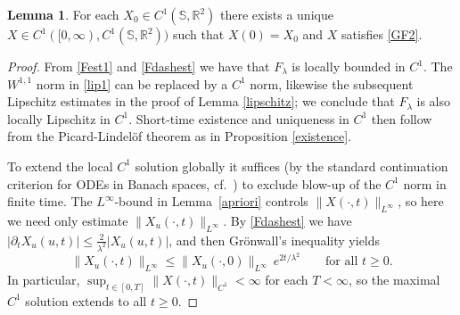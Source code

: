 \documentclass[a4paper,11pt]{amsart}
\theoremstyle{definition}\newtheorem*{definition}{Definition}
\theoremstyle{definition} \newtheorem{proposition}[theorem]{Proposition}
\theoremstyle{definition}\newtheorem{lemma}[theorem]{Lemma}
\theoremstyle{definition}\newtheorem{corollary}[theorem]{Corollary}
\theoremstyle{definition}\newtheorem{example}{Example}
\theoremstyle{remark}\newtheorem*{remark}{Remark}
\def\R{\mathbb{R}}
\def\S{\mathbb{S}}
\def\length{\mathcal L}
\begin{document}
\begin{lemma}\label{C1Lipschitz}
For each $X_0\in C^{1}(\S,\R^2)$ there exists a unique $X\in C^1([0,\infty),C^{1}(\S,\R^2))$ such that $X(0)=X_0$ and $X$ satisfies \eqref{GF2}. 
\end{lemma}
\begin{proof}
From \eqref{Fest1} and \eqref{Fdashest} we have that $F_\lambda$ is locally bounded in $C^1$. The $W^{1,1}$ norm in \eqref{lip1} can be replaced by a $C^1$ norm, likewise the subsequent Lipschitz estimates in the proof of Lemma \ref{lipschitz}; we conclude that $F_\lambda$ is also locally Lipschitz in $C^1$. Short-time existence and uniqueness in $C^1$ then follow from the Picard-Lindel\"of theorem as in Proposition \ref{existence}.

To extend the local $C^1$ solution globally it suffices (by the standard continuation criterion for ODEs in Banach spaces, cf.\ \cite{Zeidler:1986aa}) to exclude blow-up of the $C^1$ norm in finite time.
The $L^\infty$-bound in Lemma~\ref{apriori} controls $\|X(\cdot,t)\|_{L^\infty}$, so here we need only estimate $\|X_u(\cdot,t)\|_{L^\infty}$.
By \eqref{Fdashest} we have $|\partial_t X_u(u,t)|\le \frac{2}{\lambda^2}|X_u(u,t)|$, and then Gr\"onwall's inequality yields
\begin{equation}\label{C1bound}
\|X_u(\cdot,t)\|_{L^\infty}\le \|X_u(\cdot,0)\|_{L^\infty}\,e^{2t/\lambda^2}\qquad\text{for all }t\ge0.
\end{equation}
In particular, $\sup_{t\in[0,T]}\|X(\cdot,t)\|_{C^1}<\infty$ for each $T<\infty$, so the maximal $C^1$ solution extends to all $t\ge0$.
\end{proof}
\end{document}
